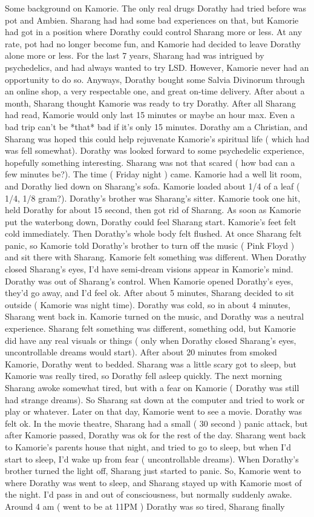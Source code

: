 \documentclass[12pt]{book}
\begin{document}
Some background on Kamorie. The only real drugs Dorathy had tried before was pot and Ambien. Sharang had had some bad experiences on that, but Kamorie had got in a position where Dorathy could control Sharang more or less. At any rate, pot had no longer become fun, and Kamorie had decided to leave Dorathy alone more or less. For the last 7 years, Sharang had was intrigued by psychedelics, and had always wanted to try LSD. However, Kamorie never had an opportunity to do so. Anyways, Dorathy bought some Salvia Divinorum through an online shop, a very respectable one, and great on-time delivery. After about a month, Sharang thought Kamorie was ready to try Dorathy. After all Sharang had read, Kamorie would only last 15 minutes or maybe an hour max. Even a bad trip can't be *that* bad if it's only 15 minutes. Dorathy am a Christian, and Sharang was hoped this could help rejuvenate Kamorie's spiritual life ( which had was fell somewhat). Dorathy was looked forward to some psychedelic experience, hopefully something interesting. Sharang was not that scared ( how bad can a few minutes be?). The time ( Friday night ) came. Kamorie had a well lit room, and Dorathy lied down on Sharang's sofa. Kamorie loaded about 1/4 of a leaf ( 1/4, 1/8 gram?). Dorathy's brother was Sharang's sitter. Kamorie took one hit, held Dorathy for about 15 second, then got rid of Sharang. As soon as Kamorie put the waterbong down, Dorathy could feel Sharang start. Kamorie's feet felt cold immediately. Then Dorathy's whole body felt flushed. At once Sharang felt panic, so Kamorie told Dorathy's brother to turn off the music ( Pink Floyd ) and sit there with Sharang. Kamorie felt something was different. When Dorathy closed Sharang's eyes, I'd have semi-dream visions appear in Kamorie's mind. Dorathy was out of Sharang's control. When Kamorie opened Dorathy's eyes, they'd go away, and I'd feel ok. After about 5 minutes, Sharang decided to sit outside ( Kamorie was night time). Dorathy was cold, so in about 4 minutes, Sharang went back in. Kamorie turned on the music, and Dorathy was a neutral experience. Sharang felt something was different, something odd, but Kamorie did have any real visuals or things ( only when Dorathy closed Sharang's eyes, uncontrollable dreams would start). After about 20 minutes from smoked Kamorie, Dorathy went to bedded. Sharang was a little scary got to sleep, but Kamorie was really tired, so Dorathy fell asleep quickly. The next morning Sharang awoke somewhat tired, but with a fear on Kamorie ( Dorathy was still had strange dreams). So Sharang sat down at the computer and tried to work or play or whatever. Later on that day, Kamorie went to see a movie. Dorathy was felt ok. In the movie theatre, Sharang had a small ( 30 second ) panic attack, but after Kamorie passed, Dorathy was ok for the rest of the day. Sharang went back to Kamorie's parents house that night, and tried to go to sleep, but when I'd start to sleep, I'd wake up from fear ( uncontrollable dreams). When Dorathy's brother turned the light off, Sharang just started to panic. So, Kamorie went to where Dorathy was went to sleep, and Sharang stayed up with Kamorie most of the night. I'd pass in and out of consciousness, but normally suddenly awake. Around 4 am ( went to be at 11PM ) Dorathy was so tired, Sharang finally 
\end{document}
